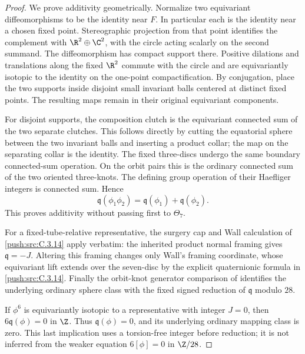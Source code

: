 \begin{proof}
We prove additivity geometrically. Normalize two equivariant
diffeomorphisms to be the identity near $F$. In particular each
is the identity near a chosen fixed point. Stereographic
projection from that point identifies the complement with
$\R^2\oplus\C^2$, with the circle acting scalarly on the
second summand. The diffeomorphism has compact support there.
Positive dilations and translations along the fixed $\R^2$
commute with the circle and are equivariantly isotopic to the
identity on the one-point compactification. By conjugation,
place the two supports inside disjoint small invariant balls
centered at distinct fixed points. The resulting maps remain
in their original equivariant components.

For disjoint supports, the composition clutch is the
equivariant connected sum of the two separate clutches.
This follows directly by cutting the equatorial sphere between
the two invariant balls and inserting a product collar; the
map on the separating collar is the identity. The fixed
three-discs undergo the same boundary connected-sum operation.
On the orbit pairs this is the ordinary connected sum of
the two oriented three-knots. The defining group operation
of their Haefliger integers is connected sum. Hence
\[
 \mathfrak q(\phi_1\phi_2)
 =\mathfrak q(\phi_1)+\mathfrak q(\phi_2).
\]
This proves additivity without passing first to $\Theta_7$.

For a fixed-tube-relative representative, the surgery cap and
Wall calculation of \ref{push:src:C.3.14} apply verbatim: the inherited product
normal framing gives $\mathfrak q=-J$. Altering this framing
changes only Wall's framing coordinate, whose equivariant lift
extends over the seven-disc by the explicit quaternionic
formula in \ref{push:src:C.3.14}. Finally the orbit-knot generator comparison
of \citet[Example 7.14 and Proposition 7.15]{Davis1982D}
identifies the underlying ordinary sphere class with the fixed
signed reduction of $\mathfrak q$ modulo $28$.

If $\phi^6$ is equivariantly isotopic to a representative with
integer $J=0$, then $6\mathfrak q(\phi)=0$ in $\Z$.
Thus $\mathfrak q(\phi)=0$, and its underlying ordinary
mapping class is zero. This last implication uses a torsion-free
integer before reduction; it is not inferred from the weaker
equation $6[\phi]=0$ in $\Z/28$.
\end{proof}
